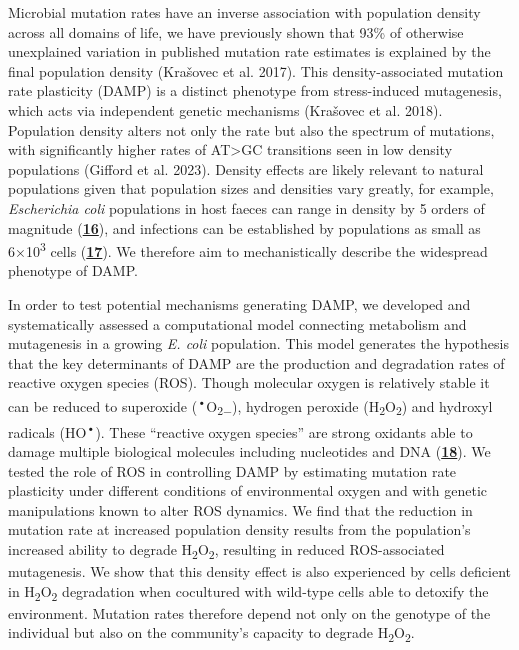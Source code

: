 \documentclass[
  12pt,
  letterpaper,
  DIV=11,
  numbers=noendperiod]{scrreprt}
\begin{document}
Microbial mutation rates have an inverse association with population
density across all domains of life, we have previously shown that 93\%
of otherwise unexplained variation in published mutation rate estimates
is explained by the final population density (Krašovec et al. 2017).
This density-associated mutation rate plasticity (DAMP) is a distinct
phenotype from stress-induced mutagenesis, which acts via independent
genetic mechanisms (Krašovec et al. 2018). Population density alters not
only the rate but also the spectrum of mutations, with significantly
higher rates of AT\textgreater GC transitions seen in low density
populations (Gifford et al. 2023). Density effects are likely relevant
to natural populations given that population sizes and densities vary
greatly, for example, \emph{Escherichia coli} populations in host faeces
can range in density by 5 orders of magnitude
(\href{https://www.biorxiv.org/content/10.1101/2023.09.27.557722v1.full\#ref-16}{\textbf{16}}),
and infections can be established by populations as small as
6×10\textsuperscript{3} cells
(\href{https://www.biorxiv.org/content/10.1101/2023.09.27.557722v1.full\#ref-17}{\textbf{17}}).
We therefore aim to mechanistically describe the widespread phenotype of
DAMP.

In order to test potential mechanisms generating DAMP, we developed and
systematically assessed a computational model connecting metabolism and
mutagenesis in a growing \emph{E. coli} population. This model generates
the hypothesis that the key determinants of DAMP are the production and
degradation rates of reactive oxygen species (ROS). Though molecular
oxygen is relatively stable it can be reduced to superoxide
(\textsuperscript{•}O\textsubscript{2−}), hydrogen peroxide
(H\textsubscript{2}O\textsubscript{2}) and hydroxyl radicals
(HO\textsuperscript{•}). These ``reactive oxygen species'' are strong
oxidants able to damage multiple biological molecules including
nucleotides and DNA
(\href{https://www.biorxiv.org/content/10.1101/2023.09.27.557722v1.full\#ref-18}{\textbf{18}}).
We tested the role of ROS in controlling DAMP by estimating mutation
rate plasticity under different conditions of environmental oxygen and
with genetic manipulations known to alter ROS dynamics. We find that the
reduction in mutation rate at increased population density results from
the population's increased ability to degrade
H\textsubscript{2}O\textsubscript{2}, resulting in reduced
ROS-associated mutagenesis. We show that this density effect is also
experienced by cells deficient in H\textsubscript{2}O\textsubscript{2}
degradation when cocultured with wild-type cells able to detoxify the
environment. Mutation rates therefore depend not only on the genotype of
the individual but also on the community's capacity to degrade
H\textsubscript{2}O\textsubscript{2}.
\end{document}

